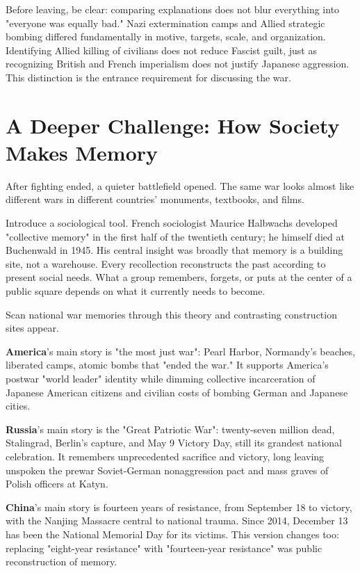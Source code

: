 Before leaving, be clear: comparing explanations does not blur everything into "everyone was equally bad." Nazi extermination camps and Allied strategic bombing differed fundamentally in motive, targets, scale, and organization. Identifying Allied killing of civilians does not reduce Fascist guilt, just as recognizing British and French imperialism does not justify Japanese aggression. This distinction is the entrance requirement for discussing the war.

\section[How Society Makes Memory]{A Deeper Challenge: How Society Makes Memory}
After fighting ended, a quieter battlefield opened. The same war looks almost like different wars in different countries' monuments, textbooks, and films.

Introduce a sociological tool. French sociologist Maurice Halbwachs developed "collective memory" in the first half of the twentieth century; he himself died at Buchenwald in 1945. His central insight was broadly that memory is a building site, not a warehouse. Every recollection reconstructs the past according to present social needs. What a group remembers, forgets, or puts at the center of a public square depends on what it currently needs to become.

Scan national war memories through this theory and contrasting construction sites appear.

\textbf{America}'s main story is "the most just war": Pearl Harbor, Normandy's beaches, liberated camps, atomic bombs that "ended the war." It supports America's postwar "world leader" identity while dimming collective incarceration of Japanese American citizens and civilian costs of bombing German and Japanese cities.

\textbf{Russia}'s main story is the "Great Patriotic War": twenty-seven million dead, Stalingrad, Berlin's capture, and May 9 Victory Day, still its grandest national celebration. It remembers unprecedented sacrifice and victory, long leaving unspoken the prewar Soviet-German nonaggression pact and mass graves of Polish officers at Katyn.

\textbf{China}'s main story is fourteen years of resistance, from September 18 to victory, with the Nanjing Massacre central to national trauma. Since 2014, December 13 has been the National Memorial Day for its victims. This version changes too: replacing "eight-year resistance" with "fourteen-year resistance" was public reconstruction of memory.

